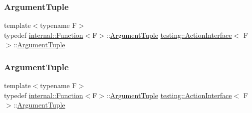 \mbox{\label{classtesting_1_1_action_interface_af72720d864da4d606629e83edc003511}} 
\subsubsection{\texorpdfstring{ArgumentTuple}{ArgumentTuple}\hspace{0.1cm}{\footnotesize\ttfamily [2/3]}}
{\footnotesize\ttfamily template$<$typename F$>$ \\
typedef \mbox{\hyperlink{structtesting_1_1internal_1_1_function}{internal\+::\+Function}}$<$F$>$\+::\mbox{\hyperlink{classtesting_1_1_action_interface_af72720d864da4d606629e83edc003511}{Argument\+Tuple}} \mbox{\hyperlink{classtesting_1_1_action_interface}{testing\+::\+Action\+Interface}}$<$ F $>$\+::\mbox{\hyperlink{classtesting_1_1_action_interface_af72720d864da4d606629e83edc003511}{Argument\+Tuple}}}

\mbox{\label{classtesting_1_1_action_interface_af72720d864da4d606629e83edc003511}} 
\subsubsection{\texorpdfstring{ArgumentTuple}{ArgumentTuple}\hspace{0.1cm}{\footnotesize\ttfamily [3/3]}}
{\footnotesize\ttfamily template$<$typename F$>$ \\
typedef \mbox{\hyperlink{structtesting_1_1internal_1_1_function}{internal\+::\+Function}}$<$F$>$\+::\mbox{\hyperlink{classtesting_1_1_action_interface_af72720d864da4d606629e83edc003511}{Argument\+Tuple}} \mbox{\hyperlink{classtesting_1_1_action_interface}{testing\+::\+Action\+Interface}}$<$ F $>$\+::\mbox{\hyperlink{classtesting_1_1_action_interface_af72720d864da4d606629e83edc003511}{Argument\+Tuple}}}

\mbox{\label{classtesting_1_1_action_interface_a7477de2fe3e4e01c59db698203acaee7}} 
